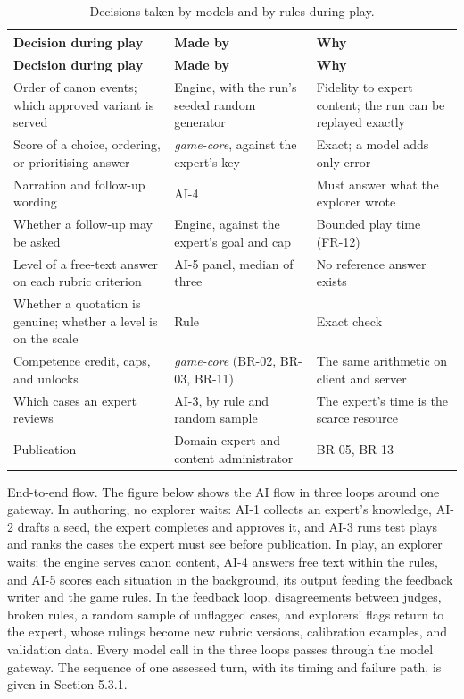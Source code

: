 {\small
\begin{longtable}{|>{\raggedright\arraybackslash}p{}|>{\raggedright\arraybackslash}p{}|>{\raggedright\arraybackslash}p{}|}
\caption{Decisions taken by models and by rules during play.} \\
\hline
\textbf{Decision during play} & \textbf{Made by} & \textbf{Why} \\ \hline
\endfirsthead
\hline
\textbf{Decision during play} & \textbf{Made by} & \textbf{Why} \\ \hline
\endhead
Order of canon events; which approved variant is served & Engine, with the run's seeded random generator & Fidelity to expert content; the run can be replayed exactly \\ \hline
Score of a choice, ordering, or prioritising answer & \textit{game-core}, against the expert's key & Exact; a model adds only error \\ \hline
Narration and follow-up wording & AI-4 & Must answer what the explorer wrote \\ \hline
Whether a follow-up may be asked & Engine, against the expert's goal and cap & Bounded play time (FR-12) \\ \hline
Level of a free-text answer on each rubric criterion & AI-5 panel, median of three & No reference answer exists \\ \hline
Whether a quotation is genuine; whether a level is on the scale & Rule & Exact check \\ \hline
Competence credit, caps, and unlocks & \textit{game-core} (BR-02, BR-03, BR-11) & The same arithmetic on client and server \\ \hline
Which cases an expert reviews & AI-3, by rule and random sample & The expert's time is the scarce resource \\ \hline
Publication & Domain expert and content administrator & BR-05, BR-13 \\ \hline
\end{longtable}
}

End-to-end flow. The figure below shows the AI flow in three loops around one gateway. In authoring, no explorer waits: AI-1 collects an expert's knowledge, AI-2 drafts a seed, the expert completes and approves it, and AI-3 runs test plays and ranks the cases the expert must see before publication. In play, an explorer waits: the engine serves canon content, AI-4 answers free text within the rules, and AI-5 scores each situation in the background, its output feeding the feedback writer and the game rules. In the feedback loop, disagreements between judges, broken rules, a random sample of unflagged cases, and explorers' flags return to the expert, whose rulings become new rubric versions, calibration examples, and validation data. Every model call in the three loops passes through the model gateway. The sequence of one assessed turn, with its timing and failure path, is given in Section 5.3.1.

